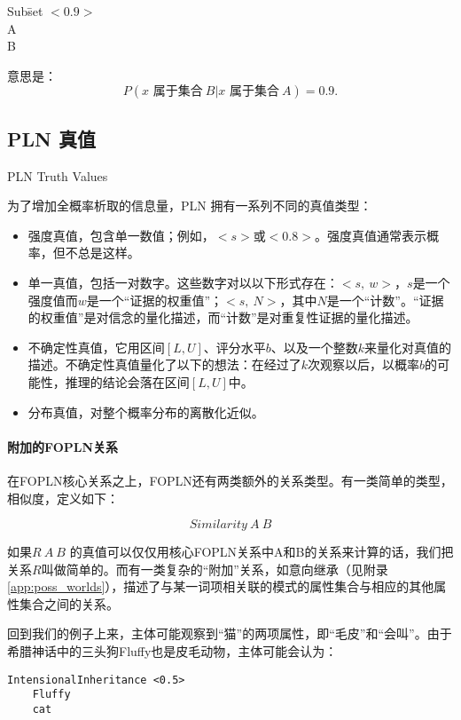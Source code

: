 \begin{tabbing}
Sub\=set $<0.9>$\\
\>A\\
\>B\\
\end{tabbing}

意思是：$$P(x \mbox{ 属于集合}\ B\vert x \mbox{ 属于集合}\ A) = 0.9.$$

\subsection{PLN 真值}{PLN Truth Values}

为了增加全概率析取的信息量，PLN 拥有一系列不同的真值类型：

\begin{itemize}
\item 强度真值，包含单一数值；例如，$<s>$或$<0.8>$。强度真值通常表示概率，但不总是这样。
\item 单一真值，包括一对数字。这些数字对以以下形式存在：$<s,\ w>$，$s$是一个强度值而$w$是一个“证据的权重值”；$<s,\ N>$，其中$N$是一个“计数”。“证据的权重值”是对信念的量化描述，而“计数”是对重复性证据的量化描述。
\item 不确定性真值，它用区间$[L,U]$、评分水平$b$、以及一个整数$k$来量化对真值的描述。不确定性真值量化了以下的想法：在经过了$k$次观察以后，以概率$b$的可能性，推理的结论会落在区间$[L,U]$中。
\item 分布真值，对整个概率分布的离散化近似。
\end{itemize}

\paragraph{附加的FOPLN关系}

在FOPLN核心关系之上，FOPLN还有两类额外的关系类型。有一类简单的类型，相似度，定义如下：

$$
Similarity \ A \ B
$$

如果$R \ A \ B$ 的真值可以仅仅用核心FOPLN关系中A和B的关系来计算的话，我们把关系$R$叫做简单的。而有一类复杂的“附加”关系，如意向继承（见附录\ref{app:poss_worlds}），描述了与某一词项相关联的模式的属性集合与相应的其他属性集合之间的关系。

回到我们的例子上来，主体可能观察到“猫”的两项属性，即“毛皮”和“会叫”。由于希腊神话中的三头狗Fluffy也是皮毛动物，主体可能会认为：

{\tt\begin{small}\begin{lstlisting}
IntensionalInheritance <0.5>
	Fluffy
	cat
\end{lstlisting}\end{small}}

